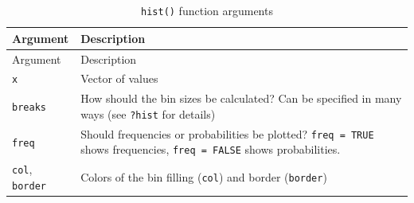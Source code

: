\documentclass[]{book}
\theoremstyle{definition}
\theoremstyle{definition}
\theoremstyle{remark}
\begin{document}
\begin{longtable}[]{@{}ll@{}}
\caption{\label{tab:hist} \texttt{hist()} function arguments}\tabularnewline
\toprule
\begin{minipage}[b]{0.18\columnwidth}\raggedright\strut
Argument\strut
\end{minipage} & \begin{minipage}[b]{0.67\columnwidth}\raggedright\strut
Description\strut
\end{minipage}\tabularnewline
\midrule
\endfirsthead
\toprule
\begin{minipage}[b]{0.18\columnwidth}\raggedright\strut
Argument\strut
\end{minipage} & \begin{minipage}[b]{0.67\columnwidth}\raggedright\strut
Description\strut
\end{minipage}\tabularnewline
\midrule
\endhead
\begin{minipage}[t]{0.18\columnwidth}\raggedright\strut
\texttt{x}\strut
\end{minipage} & \begin{minipage}[t]{0.67\columnwidth}\raggedright\strut
Vector of values\strut
\end{minipage}\tabularnewline
\begin{minipage}[t]{0.18\columnwidth}\raggedright\strut
\texttt{breaks}\strut
\end{minipage} & \begin{minipage}[t]{0.67\columnwidth}\raggedright\strut
How should the bin sizes be calculated? Can be specified in many ways
(see \texttt{?hist} for details)\strut
\end{minipage}\tabularnewline
\begin{minipage}[t]{0.18\columnwidth}\raggedright\strut
\texttt{freq}\strut
\end{minipage} & \begin{minipage}[t]{0.67\columnwidth}\raggedright\strut
Should frequencies or probabilities be plotted? \texttt{freq\ =\ TRUE}
shows frequencies, \texttt{freq\ =\ FALSE} shows probabilities.\strut
\end{minipage}\tabularnewline
\begin{minipage}[t]{0.18\columnwidth}\raggedright\strut
\texttt{col}, \texttt{border}\strut
\end{minipage} & \begin{minipage}[t]{0.67\columnwidth}\raggedright\strut
Colors of the bin filling (\texttt{col}) and border
(\texttt{border})\strut
\end{minipage}\tabularnewline
\bottomrule
\end{longtable}
\end{document}
